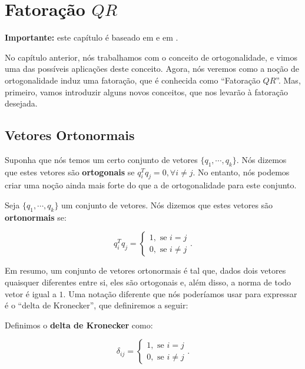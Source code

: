 \chapter{Fatoração \texorpdfstring{$QR$}{QR}}
\label{cap:fatoração-qr}

\textbf{Importante:} este capítulo é baseado em \cite{slide5doyuri} e em \cite{lista2dealn}.

No capítulo anterior, nós trabalhamos com o conceito de ortogonalidade, e vimos uma das possíveis aplicações deste conceito. Agora, nós veremos como a noção de ortogonalidade induz uma fatoração, que é conhecida como ``Fatoração $QR$''. Mas, primeiro, vamos introduzir alguns novos conceitos, que nos levarão à fatoração desejada.

\section{Vetores Ortonormais}

Suponha que nós temos um certo conjunto de vetores $\{q_1, \cdots, q_k\}$. Nós dizemos que estes vetores são \textbf{ortogonais} se $q_i^Tq_j = 0, \forall i\neq j$. No entanto, nós podemos criar uma noção ainda mais forte do que a de ortogonalidade para este conjunto.

\begin{Definition}
	Seja $\{q_1, \cdots, q_k\}$ um conjunto de vetores. Nós dizemos que estes vetores são \textbf{ortonormais} se:
	
	$$
	q_i^Tq_j = \begin{cases}
		1, \text{ se $i = j$} \\
		0, \text{ se $i\neq j$}
	\end{cases}.
	$$
\end{Definition}

Em resumo, um conjunto de vetores ortonormais é tal que, dados dois vetores quaisquer diferentes entre si, eles são ortogonais e, além disso, a norma de todo vetor é igual a $1$. Uma notação diferente que nós poderíamos usar para expressar é o ``delta de Kronecker'', que definiremos a seguir:

\begin{Definition}
	Definimos o \textbf{delta de Kronecker} como:
	
	$$
	\delta_{ij} = \begin{cases}
		1, \text{ se $i = j$} \\
		0, \text{ se $i\neq j$}
	\end{cases}.
	$$
\end{Definition}

